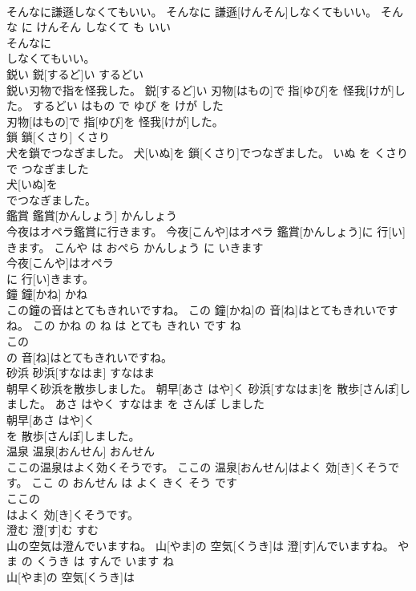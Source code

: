 \documentclass[8pt]{extreport}
\begin{document}
\begin{CJK}{UTF8}{min}
\\	そんなに謙遜しなくてもいい。	そんなに 謙遜[けんそん]しなくてもいい。	そんな に けんそん しなくて も いい	
\\	そんなに
\\	しなくてもいい。			
\\	鋭い	鋭[するど]い	するどい	
\\	鋭い刃物で指を怪我した。	鋭[するど]い 刃物[はもの]で 指[ゆび]を 怪我[けが]した。	するどい はもの で ゆび を けが した	
\\	刃物[はもの]で 指[ゆび]を 怪我[けが]した。			
\\	鎖	鎖[くさり]	くさり	
\\	犬を鎖でつなぎました。	犬[いぬ]を 鎖[くさり]でつなぎました。	いぬ を くさり で つなぎました	
\\	犬[いぬ]を
\\	でつなぎました。			
\\	鑑賞	鑑賞[かんしょう]	かんしょう	
\\	今夜はオペラ鑑賞に行きます。	今夜[こんや]はオペラ 鑑賞[かんしょう]に 行[い]きます。	こんや は おぺら かんしょう に いきます	
\\	今夜[こんや]はオペラ
\\	に 行[い]きます。			
\\	鐘	鐘[かね]	かね	
\\	この鐘の音はとてもきれいですね。	この 鐘[かね]の 音[ね]はとてもきれいですね。	この かね の ね は とても きれい です ね	
\\	この
\\	の 音[ね]はとてもきれいですね。			
\\	砂浜	砂浜[すなはま]	すなはま	
\\	朝早く砂浜を散歩しました。	朝早[あさ はや]く 砂浜[すなはま]を 散歩[さんぽ]しました。	あさ はやく すなはま を さんぽ しました	
\\	朝早[あさ はや]く
\\	を 散歩[さんぽ]しました。			
\\	温泉	温泉[おんせん]	おんせん	
\\	ここの温泉はよく効くそうです。	ここの 温泉[おんせん]はよく 効[き]くそうです。	ここ の おんせん は よく きく そう です	
\\	ここの
\\	はよく 効[き]くそうです。			
\\	澄む	澄[す]む	すむ	
\\	山の空気は澄んでいますね。	山[やま]の 空気[くうき]は 澄[す]んでいますね。	やま の くうき は すんで います ね	
\\	山[やま]の 空気[くうき]は

\end{CJK}
\end{document}
